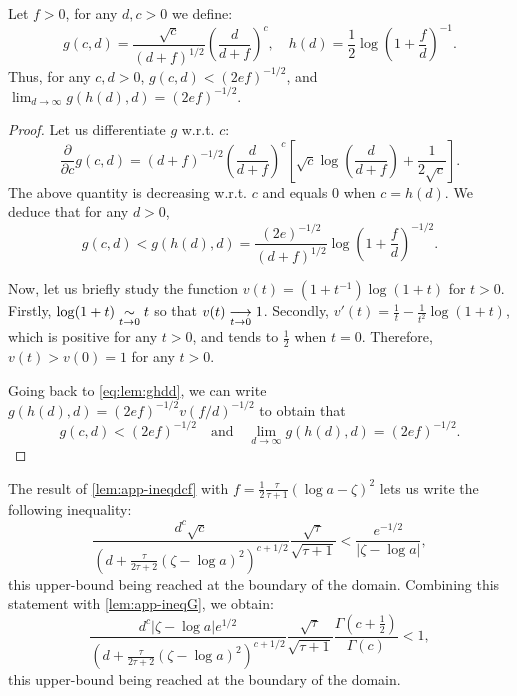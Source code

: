         \begin{lem}\label{lem:app-ineqdcf}
            Let $f>0$, for any $d,c>0$ we define:
            \begin{equation}
                g(c,d) = \frac{\sqrt{c}}{(d+f)^{1/2}}\left(\frac{d}{d+f}\right)^c, \quad h(d) = \frac{1}{2}\log\left(1+\frac{f}{d}\right)^{-1}.
            \end{equation}
            Thus, for any $c,d>0$, $g(c,d)<(2ef)^{-1/2}$, and $\displaystyle{\lim_{d\rightarrow\infty}g(h(d),d)=(2ef)^{-1/2}}.$
        \end{lem}
        \begin{proof}
            Let us differentiate $g$ w.r.t. $c$:
            \begin{equation}
                \frac{\partial}{\partial c}g(c,d) = (d+f)^{-1/2}\left(\frac{d}{d+f}\right)^c\left[\sqrt{c}\log\left(\frac{d}{d+f}  \right)+\frac{1}{2\sqrt{c}}\right].
            \end{equation}
            The above quantity is decreasing w.r.t. $c$ and equals $0$ when $c=h(d)$.
            We deduce that for any $d>0$, 
            \begin{equation}\label{eq:lem:ghdd}
                g(c,d)<g(h(d),d) = \frac{(2e)^{-1/2}}{(d+f)^{1/2}}\log\left(1+\frac{f}{d}\right)^{-1/2}.
            \end{equation}
            
            Now, let us briefly study the function $v(t)=(1+t^{-1})\log(1+t)$ for $t>0$.
            Firstly, $\log(1+t)\underset{t\rightarrow0}{\sim}t$ so that $v(t)\overset{\ }{\underset{t\rightarrow0}{\longrightarrow}}1$. Secondly, $v'(t) = \frac{1}{t}-\frac{1}{t^2}\log(1+t)$, which is positive for any $t>0$, and tends to $\frac{1}{2}$ when $t=0$. Therefore, $v(t)>v(0)=1$ for any $t>0$. 
    
            Going back to \cref{eq:lem:ghdd}, we can write $g(h(d),d)=(2ef)^{-1/2}v(f/d)^{-1/2}$ to obtain that
                \begin{equation}
                    g(c,d) <(2ef)^{-1/2}\quad\text{and} \quad \lim_{d\rightarrow\infty}g(h(d),d)=(2ef)^{-1/2}.
                \end{equation}
        \end{proof}
    
    The result of \cref{lem:app-ineqdcf} with $f=\frac{1}{2}\frac{\tau}{\tau+1}(\log a-\zeta)^2$ lets us write the following inequality:
        \begin{equation}
            \frac{d^c\sqrt{c}}{(d+\frac{\tau}{2\tau+2}(\zeta-\log a)^2 )^{c+1/2}}\frac{\sqrt{\tau}}{\sqrt{\tau +1}} < \frac{e^{-1/2}}{|\zeta-\log a|},
        \end{equation}
        this upper-bound being reached at the boundary of the domain. Combining this statement with \cref{lem:app-ineqG}, we obtain: 
            \begin{equation}
                \frac{d^c|\zeta-\log a|e^{1/2}}{(d+\frac{\tau}{2\tau+2}(\zeta-\log a)^2 )^{c+1/2}}\frac{\sqrt{\tau}}{\sqrt{\tau +1}}\frac{\Gamma(c+\frac{1}{2})}{\Gamma(c)} < 1,    
            \end{equation}
        this upper-bound being reached at the boundary of the domain.
    
